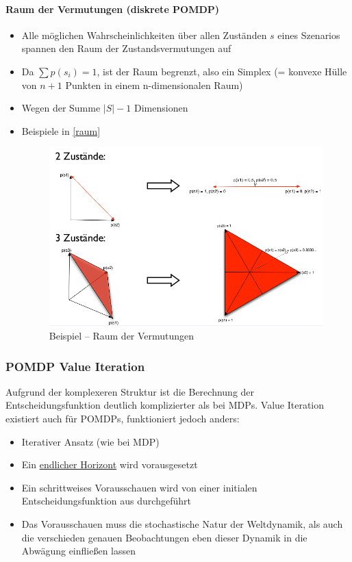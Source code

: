 \paragraph{Raum der Vermutungen (diskrete POMDP)}
\begin{itemize}
	\item Alle m\"oglichen Wahrscheinlichkeiten \"uber allen Zust\"anden $s$ eines Szenarios spannen den Raum der Zustandsvermutungen auf
	\item Da $\sum p(s_i) = 1$, ist der Raum begrenzt, also ein Simplex (= konvexe H\"ulle von $n+1$ Punkten in einem n-dimensionalen Raum)
	\item Wegen der Summe $|S|-1$ Dimensionen
	\item Beispiele in \autoref{raum}
	\begin{figure}[!h]
		\centering
  		\includegraphics[width=0.5\linewidth]{figures/ch08_raum.png}
  		\centering
		\caption{Beispiel -- Raum der Vermutungen}
		\label{raum}
	\end{figure}
\end{itemize}
\newpage
\subsubsection{POMDP Value Iteration}
Aufgrund der komplexeren Struktur ist die Berechnung der Entscheidungsfunktion deutlich komplizierter als bei MDPs. Value Iteration existiert auch für POMDPs, funktioniert jedoch anders:
\begin{itemize}
	\item Iterativer Ansatz (wie bei MDP)
	\item Ein \underline{endlicher Horizont} wird vorausgesetzt
	\item Ein schrittweises Vorausschauen wird von einer initialen Entscheidungsfunktion aus durchgef\"uhrt
	\item Das Vorausschauen muss die stochastische Natur der Weltdynamik, als auch die verschieden genauen Beobachtungen eben dieser Dynamik in die Abw\"agung einflie{\ss}en lassen
\end{itemize}

